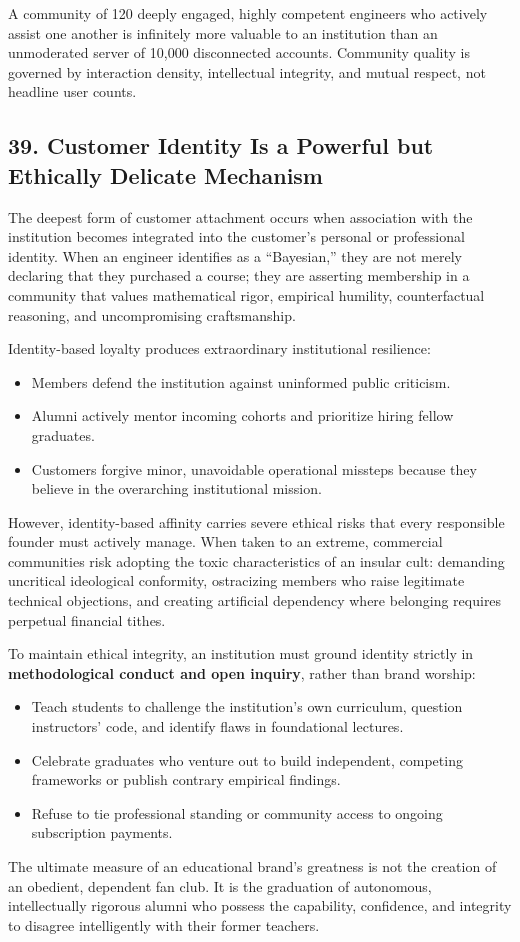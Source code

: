 A community of 120 deeply engaged, highly competent engineers who actively assist one another is infinitely more valuable to an institution than an unmoderated server of 10,000 disconnected accounts. Community quality is governed by interaction density, intellectual integrity, and mutual respect, not headline user counts.

\subsection*{39. Customer Identity Is a Powerful but Ethically Delicate Mechanism}

The deepest form of customer attachment occurs when association with the institution becomes integrated into the customer's personal or professional identity. When an engineer identifies as a ``Bayesian,'' they are not merely declaring that they purchased a course; they are asserting membership in a community that values mathematical rigor, empirical humility, counterfactual reasoning, and uncompromising craftsmanship.

Identity-based loyalty produces extraordinary institutional resilience:
\begin{itemize}[leftmargin=*]
\item Members defend the institution against uninformed public criticism.
\item Alumni actively mentor incoming cohorts and prioritize hiring fellow graduates.
\item Customers forgive minor, unavoidable operational missteps because they believe in the overarching institutional mission.
\end{itemize}

However, identity-based affinity carries severe ethical risks that every responsible founder must actively manage. When taken to an extreme, commercial communities risk adopting the toxic characteristics of an insular cult: demanding uncritical ideological conformity, ostracizing members who raise legitimate technical objections, and creating artificial dependency where belonging requires perpetual financial tithes.

To maintain ethical integrity, an institution must ground identity strictly in \textbf{methodological conduct and open inquiry}, rather than brand worship:
\begin{itemize}[leftmargin=*]
\item Teach students to challenge the institution's own curriculum, question instructors' code, and identify flaws in foundational lectures.
\item Celebrate graduates who venture out to build independent, competing frameworks or publish contrary empirical findings.
\item Refuse to tie professional standing or community access to ongoing subscription payments.
\end{itemize}

The ultimate measure of an educational brand's greatness is not the creation of an obedient, dependent fan club. It is the graduation of autonomous, intellectually rigorous alumni who possess the capability, confidence, and integrity to disagree intelligently with their former teachers.
